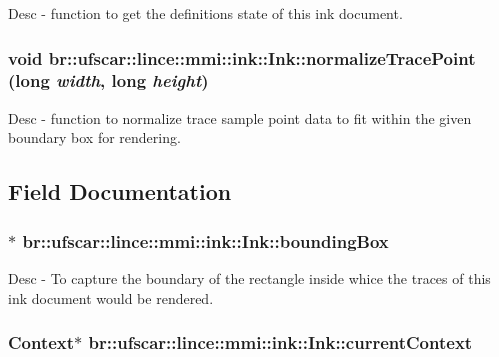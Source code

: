 Desc -\/ function to get the definitions state of this ink document. 

\hypertarget{classbr_1_1ufscar_1_1lince_1_1mmi_1_1ink_1_1Ink_a6f102e2395f0ebac1d4044291389cbf2}{
\subsubsection[{normalizeTracePoint}]{\setlength{\rightskip}{0pt plus 5cm}void br::ufscar::lince::mmi::ink::Ink::normalizeTracePoint (long {\em width}, \/  long {\em height})}}
\label{classbr_1_1ufscar_1_1lince_1_1mmi_1_1ink_1_1Ink_a6f102e2395f0ebac1d4044291389cbf2}


Desc -\/ function to normalize trace sample point data to fit within the given boundary box for rendering. 



\subsection{Field Documentation}
\hypertarget{classbr_1_1ufscar_1_1lince_1_1mmi_1_1ink_1_1Ink_aba7f2aa5e6398319ff07182898bc21a8}{
\subsubsection[{boundingBox}]{$\ast$ {\bf br::ufscar::lince::mmi::ink::Ink::boundingBox}}}
\label{classbr_1_1ufscar_1_1lince_1_1mmi_1_1ink_1_1Ink_aba7f2aa5e6398319ff07182898bc21a8}


Desc -\/ To capture the boundary of the rectangle inside whice the traces of this ink document would be rendered. 

\hypertarget{classbr_1_1ufscar_1_1lince_1_1mmi_1_1ink_1_1Ink_a13e685700da2ba95fa84c48b7aa339f9}{
\subsubsection[{currentContext}]{\setlength{\rightskip}{0pt plus 5cm}Context$\ast$ {\bf br::ufscar::lince::mmi::ink::Ink::currentContext}}}
\label{classbr_1_1ufscar_1_1lince_1_1mmi_1_1ink_1_1Ink_a13e685700da2ba95fa84c48b7aa339f9}


